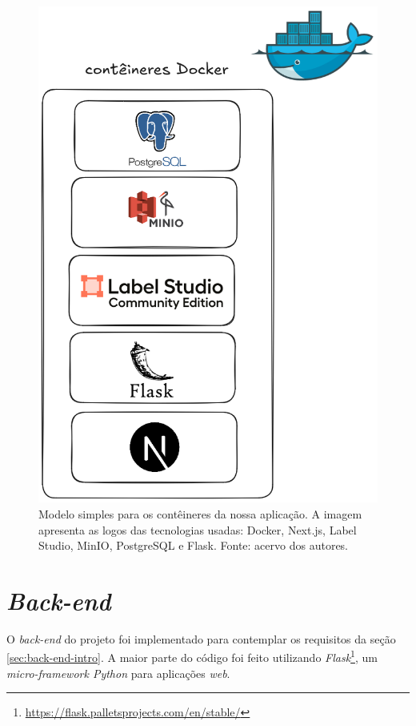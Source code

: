 \begin{figure}[htbp]
    \centering
    \includegraphics[height=0.5\textheight]{images/containers.png}
    \caption{\label{fig:containers} Modelo simples para os contêineres da nossa aplicação. A imagem apresenta as logos das tecnologias usadas: Docker, Next.js, Label Studio, MinIO, PostgreSQL e Flask. Fonte: acervo dos autores.}
\end{figure}

\section{\emph{Back-end}}
O \emph{back-end} do projeto foi implementado para contemplar os requisitos da seção \ref{sec:back-end-intro}. A maior parte do código foi feito utilizando \emph{Flask}\footnote{\url{https://flask.palletsprojects.com/en/stable/}}, um \emph{micro-framework Python} para aplicações \textit{web}.

